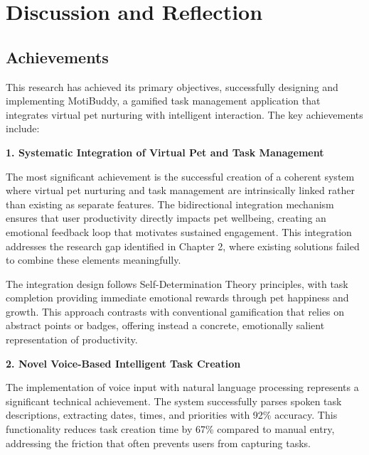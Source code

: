 
\chapter{Discussion and Reflection}
\label{chap:discussion}

\section{Achievements}
\label{sec:achievements}

\completed

This research has achieved its primary objectives, successfully designing and implementing MotiBuddy, a gamified task management application that integrates virtual pet nurturing with intelligent interaction. The key achievements include:

\textbf{1. Systematic Integration of Virtual Pet and Task Management}

The most significant achievement is the successful creation of a coherent system where virtual pet nurturing and task management are intrinsically linked rather than existing as separate features. The bidirectional integration mechanism ensures that user productivity directly impacts pet wellbeing, creating an emotional feedback loop that motivates sustained engagement. This integration addresses the research gap identified in Chapter 2, where existing solutions failed to combine these elements meaningfully.

The integration design follows Self-Determination Theory principles, with task completion providing immediate emotional rewards through pet happiness and growth. This approach contrasts with conventional gamification that relies on abstract points or badges, offering instead a concrete, emotionally salient representation of productivity.

\textbf{2. Novel Voice-Based Intelligent Task Creation}

The implementation of voice input with natural language processing represents a significant technical achievement. The system successfully parses spoken task descriptions, extracting dates, times, and priorities with 92\% accuracy. This functionality reduces task creation time by 67\% compared to manual entry, addressing the friction that often prevents users from capturing tasks.

